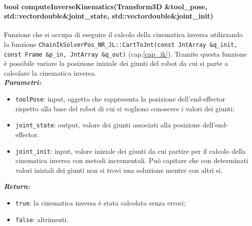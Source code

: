 \paragraph{bool computeInverseKinematics(Transform3D \&tool\_pose, std::vector\tl double\tr \&joint\_state, std::vector\tl double\tr \&joint\_init)}
Funzione che si occupa di eseguire il calcolo della cinematica inversa utilizzando la funzione \texttt{ChainIkSolverPos\_NR\_JL::CartToJnt(const JntArray \&q\_init, const Frame \&p\_in, JntArray \&q\_out)} (cap.\ref{cap_ik}). Tramite questa funzione è possibile variare la posizione iniziale dei giunti del robot da cui si parte a calcolare la cinematica inversa. \\
\textbf{\textit{Parametri:}}
\begin{itemize}
	\item \texttt{toolPose}: input, oggetto che rappresenta la posizione dell'end-effector rispetto alla base del robot di cui si vogliono conoscere i valori dei giunti;
	\item \texttt{joint\_state}: output, valore dei giunti associati alla posizione dell'end-effector.
	\item \texttt{joint\_init}: input, valore iniziale dei giunti da cui partire per il calcolo della cinematica inversa con metodi incrementali. Può capitare che con determinati valori iniziali dei giunti non si trovi una soluzione mentre con altri si. 
\end{itemize}
\textbf{\textit{Return:}}
\begin{itemize}
	\item \texttt{true}: la cinematica inversa è stata calcolata senza errori;
	\item \texttt{false}: altrimenti.
\end{itemize}


